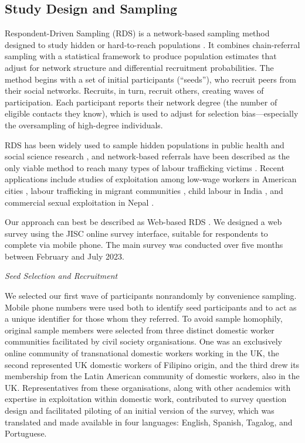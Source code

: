 \documentclass[
  12pt,
  letterpaper,
  DIV=11,
  numbers=noendperiod]{scrartcl}
\begin{document}
\subsection{Study Design and Sampling}\label{sec-study-design}

Respondent-Driven Sampling (RDS) is a network-based sampling method
designed to study hidden or hard-to-reach populations
\autocite{heck97-respondentdriven,heck11-comment,gile18-methods}. It
combines chain-referral sampling with a statistical framework to produce
population estimates that adjust for network structure and differential
recruitment probabilities. The method begins with a set of initial
participants (``seeds''), who recruit peers from their social networks.
Recruits, in turn, recruit others, creating waves of participation. Each
participant reports their network degree (the number of eligible
contacts they know), which is used to adjust for selection
bias---especially the oversampling of high-degree individuals.

RDS has been widely used to sample hidden populations in public health
and social science research
\autocite{mccr12-evaluation,schw12-prevalence}, and network-based
referrals have been described as the only viable method to reach many
types of labour trafficking victims \autocite{zhang_measuring_2012}.
Recent applications include studies of exploitation among low-wage
workers in American cities \autocite{bern09-broken}, labour trafficking
in migrant communities \autocite{vinc17-estimating}, child labour in
India \autocite{zhan19-victims}, and commercial sexual exploitation in
Nepal \autocite{jord20-overcoming}.

Our approach can best be described as Web-based RDS
\autocite{wejn08-webbased}. We designed a web survey using the JISC
online survey interface, suitable for respondents to complete via mobile
phone. The main survey was conducted over five months between February
and July 2023.

\emph{Seed Selection and Recruitment}

We selected our first wave of participants nonrandomly by convenience
sampling. Mobile phone numbers were used both to identify seed
participants and to act as a unique identifier for those whom they
referred. To avoid sample homophily, original sample members were
selected from three distinct domestic worker communities facilitated by
civil society organisations. One was an exclusively online community of
transnational domestic workers working in the UK, the second represented
UK domestic workers of Filipino origin, and the third drew its
membership from the Latin American community of domestic workers, also
in the UK. Representatives from these organisations, along with other
academics with expertise in exploitation within domestic work,
contributed to survey question design and facilitated piloting of an
initial version of the survey, which was translated and made available
in four languages: English, Spanish, Tagalog, and Portuguese.
\end{document}
